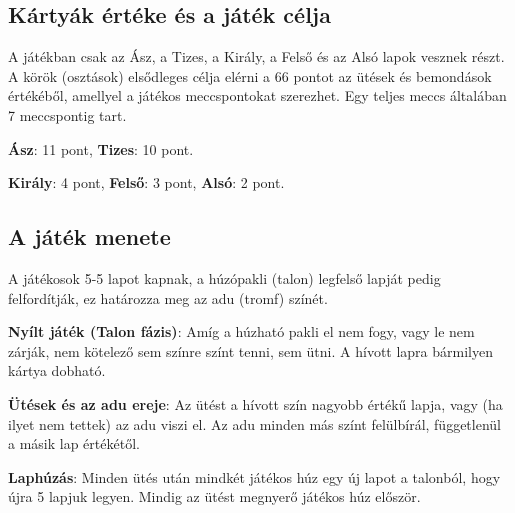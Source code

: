 \subsection{Kártyák értéke és a játék célja}
A játékban csak az Ász, a Tizes, a Király, a Felső és az Alsó lapok vesznek részt. 
A körök (osztások) elsődleges célja elérni a 66 pontot az ütések és bemondások értékéből, amellyel a játékos meccspontokat szerezhet. Egy teljes meccs általában 7 meccspontig tart.
\begin{compactitem}
    \item \textbf{Ász}: 11 pont, \textbf{Tizes}: 10 pont.
    \item \textbf{Király}: 4 pont, \textbf{Felső}: 3 pont, \textbf{Alsó}: 2 pont.
\end{compactitem}

\subsection{A játék menete}
A játékosok 5-5 lapot kapnak, a húzópakli (talon) legfelső lapját pedig felfordítják, ez határozza meg az adu (tromf) színét.
\begin{compactitem}
    \item \textbf{Nyílt játék (Talon fázis)}: Amíg a húzható pakli el nem fogy, vagy le nem zárják, nem kötelező sem színre színt tenni, sem ütni. A hívott lapra bármilyen kártya dobható.
    \item \textbf{Ütések és az adu ereje}: Az ütést a hívott szín nagyobb értékű lapja, vagy (ha ilyet nem tettek) az adu viszi el. Az adu minden más színt felülbírál, függetlenül a másik lap értékétől.
    \item \textbf{Laphúzás}: Minden ütés után mindkét játékos húz egy új lapot a talonból, hogy újra 5 lapjuk legyen. Mindig az ütést megnyerő játékos húz először.
\end{compactitem}

